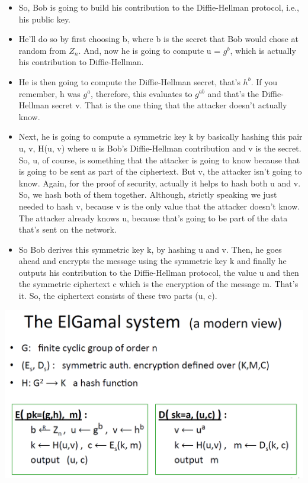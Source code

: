 \documentclass[11pt]{article}
\makeatletter
\def\maxwidth{\ifdim\Gin@nat@width>\linewidth\linewidth
    \else\Gin@nat@width\fi}
\let\Oldincludegraphics\includegraphics
\renewcommand{\includegraphics}[1]{\Oldincludegraphics[width=.8\maxwidth]{#1}}
\makeatother
\begin{document}
\begin{itemize}
\item
  So, Bob is going to build his contribution to the Diffie-Hellman
  protocol, i.e., his public key. 
\item
  He'll do so by first choosing b, where b is the secret that Bob would
  chose at random from \(Z_{n}\). And, now he is going to compute u =
  \(g^{b}\), which is actually his contribution to Diffie-Hellman.
\item
  He is then going to compute the Diffie-Hellman secret, that's
  \(h^{b}\). If you remember, h was \(g^{a}\), therefore, this evaluates
  to \(g^{ab}\) and that's the Diffie-Hellman secret v. That is the one
  thing that the attacker doesn't actually know.
\item
  Next, he is going to compute a symmetric key k by basically hashing
  this pair u, v, H(u, v) where u is Bob's Diffie-Hellman contribution
  and v is the secret. So, u, of course, is something that the attacker
  is going to know because that is going to be sent as part of the
  ciphertext. But v, the attacker isn't going to know. Again, for the
  proof of security, actually it helps to hash both u and v. So, we hash
  both of them together. Although, strictly speaking we just needed to
  hash v, because v is the only value that the attacker doesn't know.
  The attacker already knows u, because that's going to be part of the
  data that's sent on the network. 
\item
  So Bob derives this symmetric key k, by hashing u and v. Then, he goes
  ahead and encrypts the message using the symmetric key k and finally
  he outputs his contribution to the Diffie-Hellman protocol, the value
  u and then the symmetric ciphertext c which is the encryption of the
  message m. That's it. So, the ciphertext consists of these two parts
  (u, c).
\end{itemize}

\includegraphics{./Images/ElGamalSystem-EncDecryp.png}
\end{document}

